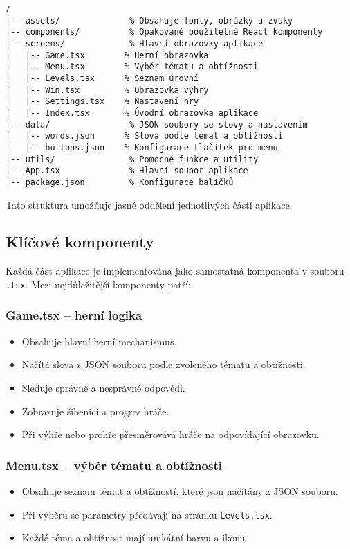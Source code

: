 \documentclass[a4paper,12pt]{article}
\begin{document}
\begin{verbatim}
/
|-- assets/              % Obsahuje fonty, obrázky a zvuky
|-- components/          % Opakovaně použitelné React komponenty
|-- screens/             % Hlavní obrazovky aplikace
|   |-- Game.tsx        % Herní obrazovka
|   |-- Menu.tsx        % Výběr tématu a obtížnosti
|   |-- Levels.tsx      % Seznam úrovní
|   |-- Win.tsx         % Obrazovka výhry
|   |-- Settings.tsx    % Nastavení hry
|   |-- Index.tsx       % Úvodní obrazovka aplikace
|-- data/                % JSON soubory se slovy a nastavením
|   |-- words.json      % Slova podle témat a obtížností
|   |-- buttons.json    % Konfigurace tlačítek pro menu
|-- utils/               % Pomocné funkce a utility
|-- App.tsx              % Hlavní soubor aplikace
|-- package.json         % Konfigurace balíčků
\end{verbatim}

Tato struktura umožňuje jasné oddělení jednotlivých částí aplikace.

\subsection{Klíčové komponenty}

Každá část aplikace je implementována jako samostatná komponenta v souboru \texttt{.tsx}. Mezi nejdůležitější komponenty patří:

\subsubsection{Game.tsx – herní logika}

\begin{itemize}
    \item Obsahuje hlavní herní mechanismus.
    \item Načítá slova z JSON souboru podle zvoleného tématu a obtížnosti.
    \item Sleduje správné a nesprávné odpovědi.
    \item Zobrazuje šibenici a progres hráče.
    \item Při výhře nebo prohře přesměrovává hráče na odpovídající obrazovku.
\end{itemize}

\subsubsection{Menu.tsx – výběr tématu a obtížnosti}

\begin{itemize}
    \item Obsahuje seznam témat a obtížností, které jsou načítány z JSON souboru.
    \item Při výběru se parametry předávají na stránku \texttt{Levels.tsx}.
    \item Každé téma a obtížnost mají unikátní barvu a ikonu.
\end{itemize}
\end{document}
